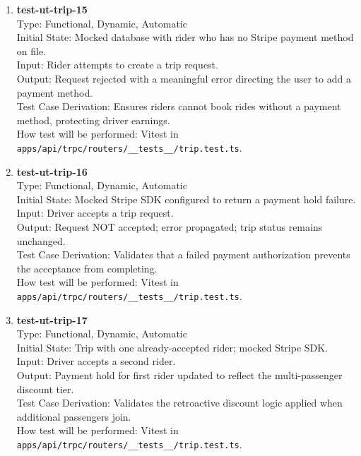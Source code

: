 \documentclass[12pt, titlepage]{article}
\begin{document}
\begin{enumerate}
\item \textbf{test-ut-trip-15}\\
Type: Functional, Dynamic, Automatic\\
Initial State: Mocked database with rider who has no Stripe payment method on file.\\
Input: Rider attempts to create a trip request.\\
Output: Request rejected with a meaningful error directing the user to add a payment method.\\
Test Case Derivation: Ensures riders cannot book rides without a payment method, protecting driver earnings.\\
How test will be performed: Vitest in \texttt{apps/api/trpc/routers/\_\_tests\_\_/trip.test.ts}.\\

\item \textbf{test-ut-trip-16}\\
Type: Functional, Dynamic, Automatic\\
Initial State: Mocked Stripe SDK configured to return a payment hold failure.\\
Input: Driver accepts a trip request.\\
Output: Request NOT accepted; error propagated; trip status remains unchanged.\\
Test Case Derivation: Validates that a failed payment authorization prevents the acceptance from completing.\\
How test will be performed: Vitest in \texttt{apps/api/trpc/routers/\_\_tests\_\_/trip.test.ts}.\\

\item \textbf{test-ut-trip-17}\\
Type: Functional, Dynamic, Automatic\\
Initial State: Trip with one already-accepted rider; mocked Stripe SDK.\\
Input: Driver accepts a second rider.\\
Output: Payment hold for first rider updated to reflect the multi-passenger discount tier.\\
Test Case Derivation: Validates the retroactive discount logic applied when additional passengers join.\\
How test will be performed: Vitest in \texttt{apps/api/trpc/routers/\_\_tests\_\_/trip.test.ts}.\\


\end{enumerate}
\end{document}
